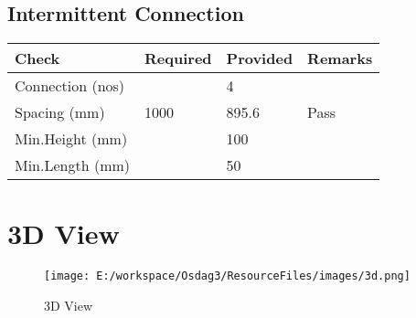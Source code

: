 \documentclass{article}%
\begin{document}
%
\newpage%
\subsection{Intermittent Connection}%
\label{subsec:IntermittentConnection}%
\renewcommand{\arraystretch}{1.2}%
\begin{longtable}{|p{2.5cm}|p{5cm}|p{7.5cm}|p{1cm}|}%
\hline%
\rowcolor{OsdagGreen}%
Check&Required&Provided&Remarks\\%
\hline%
\endhead%
\hline%
Connection (nos)& &4&\\%
\hline%
Spacing (mm)&1000&895.6&Pass\\%
\hline%
Min.Height (mm)&&100&\\%
\hline%
Min.Length (mm)&&50&\\%
\hline%
\end{longtable}

%
%
\newpage%
\section{3D View}%
\label{sec:3DView}%


\begin{figure}[h!]%
\centering%
\texttt{[image: E:/workspace/Osdag3/ResourceFiles/images/3d.png]}%
\caption{3D View}%
\end{figure}

%
\end{document}
